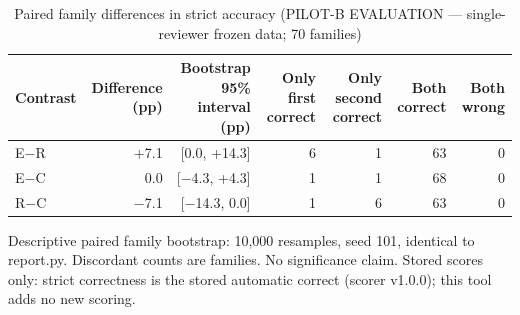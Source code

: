 \begin{table}[t]
\centering
\small
\caption{Paired family differences in strict accuracy (PILOT-B EVALUATION --- single-reviewer frozen data; 70 families)}
\label{tab:pilotb-Qwen3-8B-paired}
\begin{tabular}{lrrrrrr}
\toprule
Contrast & Difference (pp) & Bootstrap 95\% interval (pp) & Only first correct & Only second correct & Both correct & Both wrong \\
\midrule
E$-$R & +7.1 & [0.0, +14.3] & 6 & 1 & 63 & 0 \\
E$-$C & 0.0 & [$-$4.3, +4.3] & 1 & 1 & 68 & 0 \\
R$-$C & $-$7.1 & [$-$14.3, 0.0] & 1 & 6 & 63 & 0 \\
\bottomrule
\end{tabular}
\par\smallskip
\parbox{\linewidth}{\footnotesize Descriptive paired family bootstrap: 10,000 resamples, seed 101, identical to report.py. Discordant counts are families. No significance claim. Stored scores only: strict correctness is the stored automatic correct (scorer v1.0.0); this tool adds no new scoring.}
\end{table}
